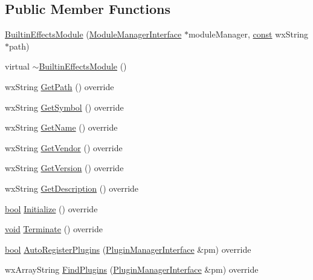 \subsection*{Public Member Functions}
\begin{DoxyCompactItemize}
\item 
\hyperlink{class_builtin_effects_module_a4897a453bfb2dc87042fa270da82423f}{Builtin\+Effects\+Module} (\hyperlink{class_module_manager_interface}{Module\+Manager\+Interface} $\ast$module\+Manager, \hyperlink{getopt1_8c_a2c212835823e3c54a8ab6d95c652660e}{const} wx\+String $\ast$path)
\item 
virtual \hyperlink{class_builtin_effects_module_abf9e7b51eb160511df868576c5724379}{$\sim$\+Builtin\+Effects\+Module} ()
\item 
wx\+String \hyperlink{class_builtin_effects_module_a3aec931501c6967a36ddf4ab44b435da}{Get\+Path} () override
\item 
wx\+String \hyperlink{class_builtin_effects_module_acba5aad9c42bd9fcdc35907cc227a537}{Get\+Symbol} () override
\item 
wx\+String \hyperlink{class_builtin_effects_module_a3a2b67717eaae53bf6b49c2887c962e7}{Get\+Name} () override
\item 
wx\+String \hyperlink{class_builtin_effects_module_a72d6a4f6517830b59a67c7cf34c39e17}{Get\+Vendor} () override
\item 
wx\+String \hyperlink{class_builtin_effects_module_ae4f3ba236d1c3aea9f05527cee8dc9db}{Get\+Version} () override
\item 
wx\+String \hyperlink{class_builtin_effects_module_a271618cf9aae28adb2402c1ffe75cb48}{Get\+Description} () override
\item 
\hyperlink{mac_2config_2i386_2lib-src_2libsoxr_2soxr-config_8h_abb452686968e48b67397da5f97445f5b}{bool} \hyperlink{class_builtin_effects_module_a1749ccf25936cc0c9ee60413f6dbc33c}{Initialize} () override
\item 
\hyperlink{sound_8c_ae35f5844602719cf66324f4de2a658b3}{void} \hyperlink{class_builtin_effects_module_a0a8381cbe623302606293cd9ac7f6608}{Terminate} () override
\item 
\hyperlink{mac_2config_2i386_2lib-src_2libsoxr_2soxr-config_8h_abb452686968e48b67397da5f97445f5b}{bool} \hyperlink{class_builtin_effects_module_a9678653b9cdc2ee0cad6f8373548bcc0}{Auto\+Register\+Plugins} (\hyperlink{class_plugin_manager_interface}{Plugin\+Manager\+Interface} \&pm) override
\item 
wx\+Array\+String \hyperlink{class_builtin_effects_module_a08776974d9294c77cbc7f2eacaf6dc34}{Find\+Plugins} (\hyperlink{class_plugin_manager_interface}{Plugin\+Manager\+Interface} \&pm) override

\end{DoxyCompactItemize}
